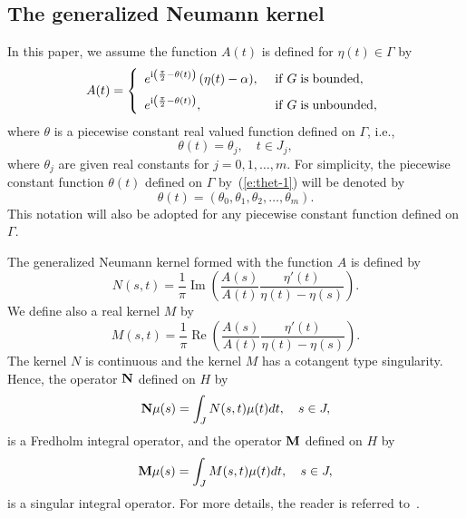 \documentclass[11pt,a4paper]{article}
\renewcommand{\Re}{\mathop{\mathrm{Re}}}
\renewcommand{\Im}{\mathop{\mathrm{Im}}}
\renewcommand{\i}{\mathrm{i}}
\renewcommand{\Re}{\mathop{\mathrm{Re}}}
\renewcommand{\Im}{\mathop{\mathrm{Im}}}
\renewcommand{\i}{\mathrm{i}}
\newcommand{\bM}{{\bf M}}
\newcommand{\bN}{{\bf N}}
\begin{document}
\subsection{The generalized Neumann kernel}


In this paper, we assume the function $A(t)$ is defined for $\eta(t)\in\Gamma$ by
\begin{equation}\label{e:A}
A(t) = \left\{
\begin{array}{l@{\hspace{0.5cm}}l}
 e^{\i\left(\frac{\pi}{2}-\theta(t)\right)}\,(\eta(t)-\alpha),     & {\rm if}\; G\; {\rm is\; bounded}, \\[6pt]
 e^{\i\left(\frac{\pi}{2}-\theta(t)\right)},                    & {\rm if}\; G\; {\rm is\; unbounded}, \\
\end{array}%
\right.
\end{equation}
where $\theta$ is a piecewise constant real valued function defined on $\Gamma$, i.e.,
\begin{equation}\label{e:thet-1}
\theta(t)=\theta_j,\quad t\in J_j,
\end{equation}
where $\theta_j$ are given real constants for $j=0,1,\ldots,m$. 
For simplicity, the piecewise constant function $\theta(t)$ defined on $\Gamma$ by~(\ref{e:thet-1}) will be denoted by
\begin{equation}\label{e:thet}
\theta(t)=(\theta_0,\theta_1,\theta_2,\ldots,\theta_m).
\end{equation}
This notation will also be adopted for any piecewise constant function defined on $\Gamma$.

The generalized Neumann kernel formed with the function $A$ is defined by
\begin{equation}\label{e:N}
 N(s,t) =  \frac{1}{\pi}\Im\left(
 \frac{A(s)}{A(t)}\frac{\eta'(t)}{\eta(t)-\eta(s)}\right).
\end{equation}
We define also a real kernel $M$ by
\begin{equation}\label{e:M}
 M(s,t) =  \frac{1}{\pi}\Re\left(
 \frac{A(s)}{A(t)}\frac{\eta'(t)}{\eta(t)-\eta(s)}\right).
\end{equation}
The kernel $N$ is continuous and the kernel $M$ has a cotangent type singularity.
Hence, the operator $\bN$ defined on $H$ by
\begin{equation}\label{e:opN}
  \bN \mu(s) = \int_J N(s,t) \mu(t) dt, \quad s\in J,
\end{equation}
is a Fredholm integral operator, and the operator $\bM$ defined on $H$ by
\begin{equation}\label{e:opM}
  \bM\mu(s) = \int_J  M(s,t) \mu(t) dt, \quad s\in J,
\end{equation}
is a singular integral operator. For more details, the reader is referred to~\cite{wegm}.
\end{document}
